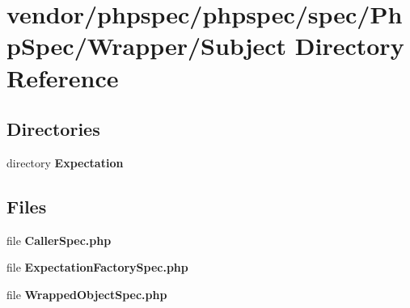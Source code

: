 \section{vendor/phpspec/phpspec/spec/\+Php\+Spec/\+Wrapper/\+Subject Directory Reference}
\label{dir_480c962acf0504e0be730eef92148bc3}
\subsection*{Directories}
\begin{DoxyCompactItemize}
\item 
directory {\bf Expectation}
\end{DoxyCompactItemize}
\subsection*{Files}
\begin{DoxyCompactItemize}
\item 
file {\bf Caller\+Spec.\+php}
\item 
file {\bf Expectation\+Factory\+Spec.\+php}
\item 
file {\bf Wrapped\+Object\+Spec.\+php}
\end{DoxyCompactItemize}
